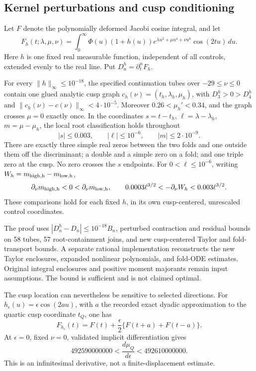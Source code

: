 \subsection{Kernel perturbations and cusp conditioning}
Let $F$ denote the polynomially deformed Jacobi cosine integral, and let
\[
 F_h(t;\lambda,\mu,\nu)=\int_0^\infty\Phi(u)(1+h(u))
 e^{\lambda u^2+\mu u^4+\nu u^6}\cos(2tu)\,du.
\]
Here $h$ is one fixed real measurable function, independent of all
controls, extended evenly to the real line. Put $D_n^h=\partial_t^nF_h$.

\begin{theorem}
For every $\|h\|_\infty\le10^{-18}$, the specified continuation tubes
over $-29\le\nu\le0$ contain one glued analytic cusp graph
$c_h(\nu)=(t_h,\lambda_h,\mu_h)$, with $D_3^h>0>D_4^h$ and
$\|c_h(\nu)-c(\nu)\|_\infty<4\cdot10^{-5}$.
Moreover $0.26<\mu_h'<0.34$, and the graph crosses $\mu=0$ exactly once.
In the coordinates $s=t-t_h$, $\ell=\lambda-\lambda_h$,
$m=\mu-\mu_h$, the local root classification holds throughout
\[
 |s|\le0.003,\qquad |\ell|\le10^{-6},\qquad |m|\le2\cdot10^{-9}.
\]
There are exactly three simple real zeros between the two folds and
one outside them off the discriminant; a double and a simple zero on
a fold; and one triple zero at the cusp. No zero crosses the $s$ endpoints.
For $0<\ell\le10^{-6}$, writing $W_h=m_{\rm high,h}-m_{\rm low,h}$,
\[
 \partial_\nu m_{\rm high,h}<0<\partial_\nu m_{\rm low,h},\qquad
 0.0003\ell^{3/2}<-\partial_\nu W_h<0.003\ell^{3/2}.
\]
These comparisons hold for each fixed $h$, in its own cusp-centered,
unrescaled control coordinates.
\end{theorem}

The proof uses $|D_n^h-D_n|\le10^{-18}B_n$, perturbed contraction
and residual bounds on 58 tubes, 57 root-containment joins, and new
cusp-centered Taylor and fold-transport bounds. A separate rational
implementation reconstructs the new Taylor enclosures, expanded
nonlinear polynomials, and fold-ODE estimates. Original integral
enclosures and positive moment majorants remain input assumptions.
The bound is sufficient and is not claimed optimal.

The cusp location can nevertheless be sensitive to selected directions.
For $h_\epsilon(u)=\epsilon\cos(2au)$, with $a$ the recorded exact
dyadic approximation to the quartic cusp coordinate $t_Q$, one has
\[
 F_{h_\epsilon}(t)=F(t)+\frac\epsilon2\{F(t+a)+F(t-a)\}.
\]
At $\epsilon=0$, fixed $\nu=0$, validated implicit differentiation gives
\[
 492590000000<\frac{d\mu_Q}{d\epsilon}<492610000000.
\]
This is an infinitesimal derivative, not a finite-displacement estimate.

